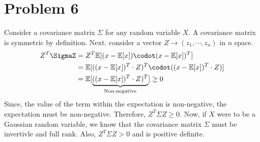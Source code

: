 \section{Problem 6}

	Consider a covariance matrix $\Sigma$ for any random variable $X$. A covariance matrix is symmetric by definition. Next. consider a vector $Z \rightarrow (z_{1}, \cdots, z_{n})$ in $n$ space.
	\begin{align*}
		Z^{T}\SigmaZ & = Z^{T} \mathbb{E} [ (x - \mathbb{E}[x]) \codot (x - \mathbb{E}[x])^{T} ] \\
		& = \mathbb{E} [ ((x - \mathbb{E}[x])^{T} \cdot Z)^{T} \codot ((x - \mathbb{E}[x])^{T} \cdot Z) ] \\
		& = \mathbb{E} [\underbrace{((x - \mathbb{E}[x])^{T} \cdot Z)^{T}}_{\text{Non-negative}}] \geq 0 \\
	\end{align*}
	Since, the value of the term within the expectation is non-negative, the expectation must be non-negative. Therefore, $Z^{T}\Sigma Z \geq 0$. Now, if $X$ were to be a Gaussian random variable, we know that the covariance matrix $\Sigma$ must be invertivle and full rank. Also, $Z^{T}\Sigma Z > 0$ and is positive definite.